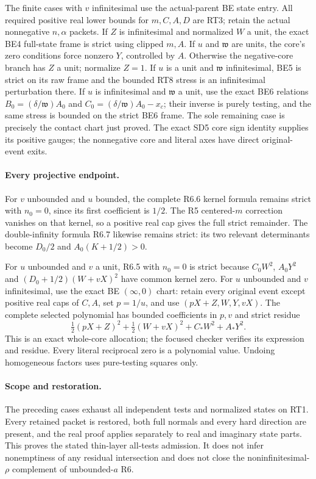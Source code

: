 The finite cases with $v$ infinitesimal use the actual-parent BE state
entry. All required positive real lower bounds for $m,C,A,D$ are RT3;
retain the actual nonnegative $n,\alpha$ packets. If $Z$ is infinitesimal
and normalized $W$ a unit, the exact BE4 full-state frame is strict
using clipped $m,A$. If $u$ and $\mathfrak w$ are units, the core's
zero conditions force nonzero $Y$, controlled by $A$. Otherwise the
negative-core branch has $Z$ a unit; normalize $Z=1$. If $u$ is a unit
and $\mathfrak w$ infinitesimal, BE5 is strict on its raw frame and
the bounded RT8 stress is an infinitesimal perturbation there. If $u$
is infinitesimal and $\mathfrak w$ a unit, use the exact BE6 relations
$B_0=(\delta/\mathfrak w)A_0$ and
$C_0=(\delta/\mathfrak w)A_0-x_c$; their inverse is purely testing,
and the same stress is bounded on the strict BE6 frame. The sole
remaining case is precisely the contact chart just proved. The exact
SD5 core sign identity supplies its positive gauges; the nonnegative
core and literal axes have direct original-event exits.

\paragraph{Every projective endpoint.}
For $v$ unbounded and $u$ bounded, the complete R6.6 kernel formula
remains strict with $n_0=0$, since its first coefficient is $1/2$.
The R5 centered-$m$ correction vanishes on that kernel, so a positive
real cap gives the full strict remainder. The double-infinity formula
R6.7 likewise remains strict: its two relevant determinants become
$D_0/2$ and $A_0(K+1/2)>0$.

For $u$ unbounded and $v$ a unit, R6.5 with $n_0=0$ is strict because
$C_0W^2$, $A_0Y^2$ and $(D_0+1/2)(W+vX)^2$ have common kernel zero.
For $u$ unbounded and $v$ infinitesimal, use the exact BE
$(\infty,0)$ chart: retain every original event except positive real
caps of $C,A$, set $p=1/u$, and use
$(pX+Z,W,Y,vX)$. The complete selected polynomial has bounded
coefficients in $p,v$ and strict residue
\[
 \tfrac12(pX+Z)^2+\tfrac12(W+vX)^2+C_*W^2+A_*Y^2.
\]
This is an exact whole-core allocation; the focused checker verifies
its expression and residue. Every literal reciprocal zero is a
polynomial value. Undoing homogeneous factors uses pure-testing
squares only.

\paragraph{Scope and restoration.}
The preceding cases exhaust all independent tests and normalized
states on RT1. Every retained packet is restored, both full normals
and every hard direction are present, and the real proof applies
separately to real and imaginary state parts. This proves the stated
thin-layer all-tests admission. It does not infer nonemptiness of any
residual intersection and does not close the noninfinitesimal-$\rho$
complement of unbounded-$a$ R6.
